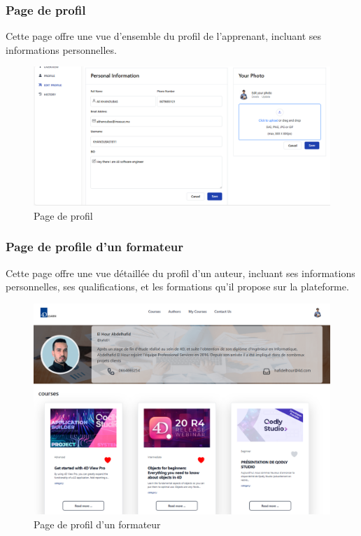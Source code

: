 \subsubsection{Page de profil}
Cette page offre une vue d'ensemble du profil de l'apprenant, incluant ses informations personnelles.

\begin{figure}[H]
    \centering
    \includegraphics[width=19cm]{Figures/profil.png}
    \caption{ Page de profil}
\end{figure}


\subsubsection{Page de profile d’un formateur}

Cette page offre une vue détaillée du profil d'un auteur, incluant ses informations personnelles, ses qualifications, et les formations qu'il propose sur la plateforme.

\begin{figure}[H]
    \centering
    \includegraphics[width=19cm]{Figures/detailsAuthor.png}
    \caption{Page de profil d’un formateur}
\end{figure}

